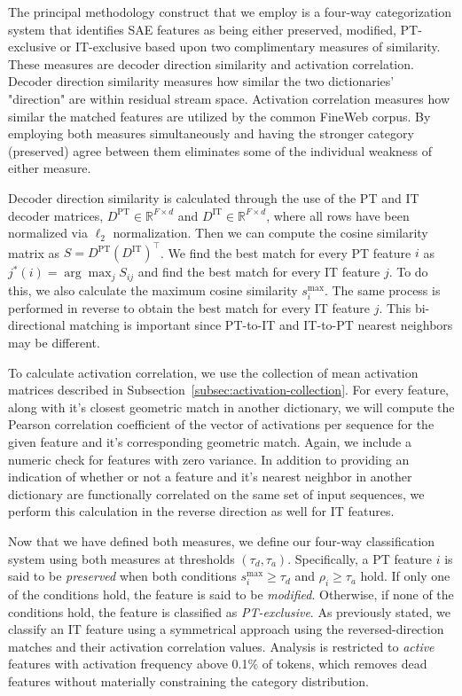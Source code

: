 The principal methodology construct that we employ is a four-way categorization system that identifies SAE features as being either preserved, modified, PT-exclusive or IT-exclusive based upon two complimentary measures of similarity. These measures are decoder direction similarity and activation correlation. Decoder direction similarity measures how similar the two dictionaries' "direction" are within residual stream space. Activation correlation measures how similar the matched features are utilized by the common FineWeb corpus. By employing both measures simultaneously and having the stronger category (preserved) agree between them eliminates some of the individual weakness of either measure.

Decoder direction similarity is calculated through the use of the PT and IT decoder matrices, $D^{\mathrm{PT}} \in \mathbb{R}^{F \times d}$ and $D^{\mathrm{IT}} \in \mathbb{R}^{F \times d}$, where all rows have been normalized via $\ell_2$ normalization. Then we can compute the cosine similarity matrix as $S = D^{\mathrm{PT}}(D^{\mathrm{IT}})^{\top}$. We find the best match for every PT feature $i$ as $j^{*}(i) = \arg\max_j S_{ij}$ and find the best match for every IT feature $j$. To do this, we also calculate the maximum cosine similarity $s^{\mathrm{max}}_i$. The same process is performed in reverse to obtain the best match for every IT feature $j$. This bi-directional matching is important since PT-to-IT and IT-to-PT nearest neighbors may be different.

To calculate activation correlation, we use the collection of mean activation matrices described in Subsection~\ref{subsec:activation-collection}. For every feature, along with it's closest geometric match in another dictionary, we will compute the Pearson correlation coefficient of the vector of activations per sequence for the given feature and it's corresponding geometric match. Again, we include a numeric check for features with zero variance. In addition to providing an indication of whether or not a feature and it's nearest neighbor in another dictionary are functionally correlated on the same set of input sequences, we perform this calculation in the reverse direction as well for IT features.

Now that we have defined both measures, we define our four-way classification system using both measures at thresholds $(\tau_d,\tau_a)$. Specifically, a PT feature $i$ is said to be \textit{preserved} when both conditions $s^{\mathrm{max}}_i \geq \tau_d$ and $\rho_i \geq \tau_a$ hold. If only one of the conditions hold, the feature is said to be \textit{modified}. Otherwise, if none of the conditions hold, the feature is classified as \textit{PT-exclusive}. As previously stated, we classify an IT feature using a symmetrical approach using the reversed-direction matches and their activation correlation values. Analysis is restricted to \textit{active} features with activation frequency above 0.1\% of tokens, which removes dead features without materially constraining the category distribution.

